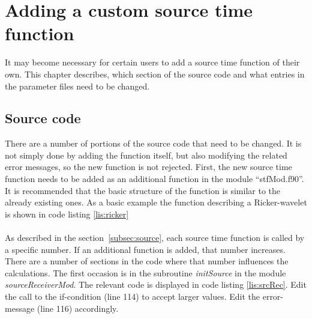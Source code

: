 \chapter{Adding a custom source time function}
\label{chap:addstf}
	It may become necessary for certain users to add a source time function of their own. This chapter describes, which section of the source code and what entries in the parameter files need to be changed.   
	\section{Source code}
	\label{sec:srcCode}
		There are a number of portions of the source code that need to be changed. It is not simply done by adding the function itself, but also modifying the related error messages, so the new function is not rejected. First, the new source time function needs to be added as an additional function in the module ``stfMod.f90''. It is recommended that the basic structure of the function is similar to the already existing ones. As a basic example the function describing a Ricker-wavelet is shown in code listing \ref{lis:ricker} \\
		 \\
    As described in the section~\ref{subsec:source}, each source time function is called by a specific number. If an additional function is added, that number increases. There are a number of sections in the code where that number influences the calculations. 
    The first occasion is in the subroutine \emph{initSource} in the module \emph{sourceReceiverMod}. The relevant code is displayed in code listing \ref{lis:srcRec}. Edit the call to the if-condition (line 114) to accept larger values. Edit the error-message (line 116) accordingly.
		
    
